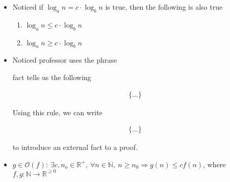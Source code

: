 \documentclass[12pt]{article}
\begin{document}
\begin{itemize}
\begin{itemize}
        \item Noticed if $\log_a n = c \cdot \log_b n$ is true, then the following
        is also true

        \begin{enumerate}[1.]
            \item $\log_a n \leq c \cdot \log_b n$
            \item $\log_a n \geq c \cdot \log_b n$
        \end{enumerate}

        \item Noticed professor uses the phrase

        \bigskip

        \begin{mdframed}

        \underline{\hspace{1cm}} fact tells us the following

        \begin{align*}
            \bigl\{ \dots \bigr\}
        \end{align*}

        Using this rule, we can write

        \begin{align*}
            \bigl\{ \dots \bigr\}
        \end{align*}

        \end{mdframed}

        to introduce an external fact to a proof.

        \item

        $g \in \mathcal{O}(f):\:\exists c,n_o \in \mathbb{R}^{+},\:\forall n \in
        \mathbb{N},\:n \geq n_0 \Rightarrow g(n) \leq cf(n)$, where $f,g:\mathbb{N} \to \mathbb{R}^{\geq 0}$

    \end{itemize}

\end{itemize}
\end{document}
